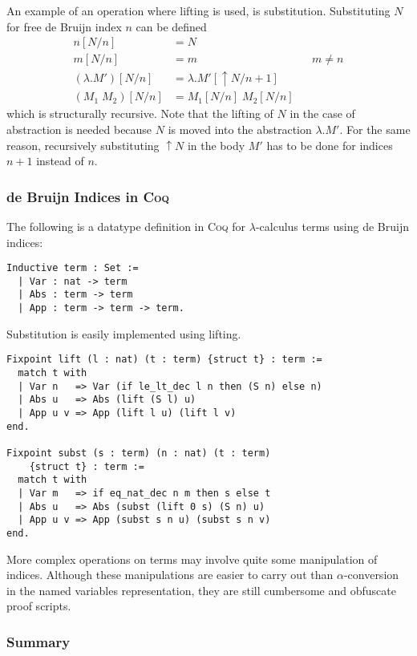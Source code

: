 \documentclass[a4paper,11pt]{article}
\newcommand{\name}[1]{\textsc{#1}\xspace}
\def\Coq{\name{Coq}}
\begin{document}
An example of an operation where lifting is used, is substitution.
Substituting $N$ for free de Bruijn index $n$ can be defined
\begin{align*}
  n[N/n]             &= N\\
  m[N/n]             &= m                    && \text{$m \neq n$} \\
  (\lambda .M')[N/n] &= \lambda .M'[\uparrow \! N / n\!+\!1]\\
  (M_1 \; M_2)[N/n]  &= M_1[N/n] \; M_2[N/n]
\end{align*}
which is structurally recursive.
Note that the lifting of $N$ in the case of abstraction is needed because
$N$ is moved into the abstraction $\lambda.M'$.
For the same reason, recursively substituting $\uparrow \! N$ in the body
$M'$ has to be done for indices $n+1$ instead of $n$.

\subsubsection*{de Bruijn Indices in \Coq}

The following is a datatype definition in \Coq for $\lambda$-calculus
terms using de Bruijn indices:
\begin{lstlisting}
Inductive term : Set :=
  | Var : nat -> term
  | Abs : term -> term
  | App : term -> term -> term.
\end{lstlisting}
Substitution is easily implemented using lifting.
\begin{lstlisting}
Fixpoint lift (l : nat) (t : term) {struct t} : term :=
  match t with
  | Var n   => Var (if le_lt_dec l n then (S n) else n)
  | Abs u   => Abs (lift (S l) u)
  | App u v => App (lift l u) (lift l v)
end.

Fixpoint subst (s : term) (n : nat) (t : term)
    {struct t} : term :=
  match t with
  | Var m   => if eq_nat_dec n m then s else t
  | Abs u   => Abs (subst (lift 0 s) (S n) u)
  | App u v => App (subst s n u) (subst s n v)
end.
\end{lstlisting}

More complex operations on terms may involve quite some
manipulation of indices.
Although these manipulations are easier to carry out than
$\alpha$-conversion in the named variables representation, they
are still cumbersome and obfuscate proof scripts.

\subsubsection*{Summary}
\end{document}
